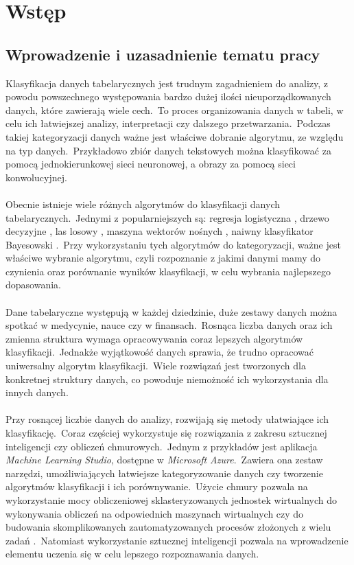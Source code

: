 \chapter{Wstęp}

\section{Wprowadzenie i uzasadnienie tematu pracy}
Klasyfikacja danych tabelarycznych jest trudnym zagadnieniem do analizy, z powodu powszechnego występowania bardzo dużej ilości nieuporządkowanych danych, które zawierają wiele cech.\ To proces organizowania danych w tabeli, w celu ich łatwiejszej analizy, interpretacji czy dalszego przetwarzania.\ Podczas takiej kategoryzacji danych ważne jest właściwe dobranie algorytmu, ze względu na typ danych.\ Przykładowo zbiór danych tekstowych można klasyfikować za pomocą jednokierunkowej sieci neuronowej, a obrazy za pomocą sieci konwolucyjnej.
\\ \\
Obecnie istnieje wiele różnych algorytmów do klasyfikacji danych tabelarycznych.\ Jednymi z popularniejszych są: regresja logistyczna , drzewo decyzyjne , las losowy , maszyna wektorów nośnych , naiwny klasyfikator Bayesowski .\ Przy wykorzystaniu tych algorytmów do kategoryzacji, ważne jest właściwe wybranie algorytmu, czyli rozpoznanie z jakimi danymi mamy do czynienia oraz porównanie wyników klasyfikacji, w celu wybrania najlepszego dopasowania.
\\ \\
Dane tabelaryczne występują w każdej dziedzinie, duże zestawy danych można spotkać w medycynie, nauce czy w finansach.\ Rosnąca liczba danych oraz ich zmienna struktura wymaga opracowywania coraz lepszych algorytmów klasyfikacji.\ Jednakże wyjątkowość danych sprawia, że trudno opracować uniwersalny algorytm klasyfikacji.\ Wiele rozwiązań jest tworzonych dla konkretnej struktury danych, co powoduje niemożność ich wykorzystania dla innych danych.
\\ \\
Przy rosnącej liczbie danych do analizy, rozwijają się metody ułatwiające ich klasyfikację.\ Coraz częściej wykorzystuje się rozwiązania z zakresu sztucznej inteligencji czy obliczeń chmurowych.\ Jednym z przykładów jest aplikacja \textit{Machine Learning Studio},  dostępne w \textit{Microsoft Azure}.\ Zawiera ona zestaw narzędzi, umożliwiających łatwiejsze kategoryzowanie danych czy tworzenie algorytmów klasyfikacji i ich porównywanie.\ Użycie chmury pozwala na wykorzystanie mocy obliczeniowej sklasteryzowanych jednostek wirtualnych do wykonywania obliczeń na odpowiednich maszynach wirtualnych czy do budowania skomplikowanych zautomatyzowanych procesów złożonych z wielu zadań .\ Natomiast wykorzystanie sztucznej inteligencji pozwala na wprowadzenie elementu uczenia się w celu lepszego rozpoznawania danych.
